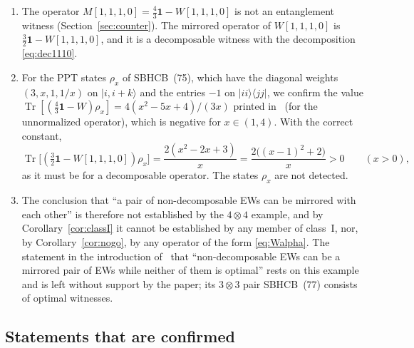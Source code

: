 \documentclass[11pt,a4paper]{article}
\theoremstyle{remark}
\newcommand{\ket}[1]{\lvert #1\rangle}
\newcommand{\ketbra}[2]{\lvert #1\rangle\langle #2\rvert}
\newcommand{\id}{\mathbf{1}}
\newcommand{\tr}{\operatorname{Tr}}
\begin{document}
\begin{enumerate}
\item The operator $M[1,1,1,0]=\tfrac43\id-W[1,1,1,0]$ is not an entanglement witness
(Section~\ref{sec:counter}). The mirrored operator of $W[1,1,1,0]$ is
$\tfrac32\id-W[1,1,1,0]$, and it is a decomposable witness with the decomposition
\eqref{eq:dec1110}.
\item For the PPT states $\rho_x$ of SBHCB~(75), which have the diagonal weights
$(3,x,1,1/x)$ on $\ket{i,i+k}$ and the entries $-1$ on $\ketbra{ii}{jj}$, we confirm the
value $\tr[(\tfrac43\id-W)\rho_x]=4(x^2-5x+4)/(3x)$ printed in~\cite{SBHCB26} (for the
unnormalized operator), which is negative for $x\in(1,4)$. With the correct constant,
\begin{equation}\label{eq:rhox}
\tr\bigl[(\tfrac32\id-W[1,1,1,0])\rho_x\bigr]=\frac{2(x^{2}-2x+3)}{x}
=\frac{2\bigl((x-1)^{2}+2\bigr)}{x}>0\qquad(x>0),
\end{equation}
as it must be for a decomposable operator. The states $\rho_x$ are not detected.
\item The conclusion that ``a pair of non-decomposable EWs can be mirrored with each
other'' is therefore not established by the $4\otimes4$ example, and by
Corollary~\ref{cor:classI} it cannot be established by any member of class~I, nor, by
Corollary~\ref{cor:nogo}, by any operator of the form \eqref{eq:Walpha}. The statement in
the introduction of~\cite{SBHCB26} that ``non-decomposable EWs can be a mirrored pair of
EWs while neither of them is optimal'' rests on this example and is left without support
by the paper; its $3\otimes3$ pair SBHCB~(77) consists of optimal witnesses.
\end{enumerate}

\subsection{Statements that are confirmed}
\end{document}
